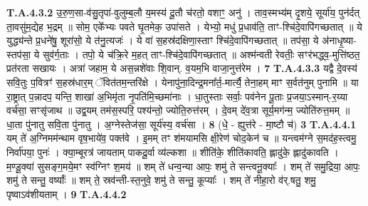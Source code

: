 \documentclass[17pt]{extarticle}
\begin{document}
                  \newline
                                                                  \textbf{ T.A.4.3.2} \newline
                  उ॒रु॒ण॒सा-व॑सु॒तृपा॑-वुलुम्ब॒लौ य॒मस्य॑ दू॒तौ च॑रतो॒ वशाꣳ॒॒ अनु॑ । ताव॒स्मभ्य॑म् दृ॒शये॒ सूर्या॑य॒ पुन॑र्दत् ता॒वसु॑म॒द्येह भ॒द्रम् ॥  सोम॒ एके᳚भ्यः पवते घृ॒तमेक॒ उपा॑सते ।  येभ्यो॒ मधु॑ प्र॒धाव॑ति॒ ताꣳ-श्चि॑दे॒वापि॑गच्छतात् ॥  ये युद्ध्य॑न्ते प्र॒धने॑षु॒ शूरा॑सो॒ ये त॑नु॒त्यजः॑ । ये वा॑ स॒हस्र॑दक्षिणा॒स्ताꣳ श्चि॑दे॒वापि॑गच्छतात् ॥  तप॑सा॒ ये अ॑नाधृ॒ष्या-स्तप॑सा॒ ये सुव॑र्ग॒ताः ।  तपो॒ ये च॑क्रि॒रे म॒हत् ताꣳ-श्चि॑दे॒वापि॑गच्छतात् ॥  अश्म॑न्वती रेवतीः॒ सꣳर॑भद्ध्व॒-मुत्ति॑ष्ठत॒ प्रत॑रता सखायः । अत्रा॑ जहाम॒ ये अस॒न्नशे॑वाः शि॒वान्. व॒यम॒भि वाजा॒नुत्त॑रेम । \textbf{ 7} \newline
                  \newline
                                                                  \textbf{ T.A.4.3.3} \newline
                  यद्वै दे॒वस्य॑ सवि॒तुः प॒वित्रꣳ॑ स॒हस्र॑धार॒म् ॅवित॑तम॒न्तरि॑क्षे । येनापु॑ना॒दिन्द्र॒मना᳚र्त॒-मार्त्यै॒ तेना॒हम् माꣳ स॒र्वत॑नुम् पुनामि ॥  या रा॒ष्ट्रात् प॒न्नादप॒ यन्ति॒ शाखा॑ अ॒भिमृ॑ता नृ॒पति॑मि॒च्छमा॑नाः । धा॒तुस्ताः सर्वाः॒ पव॑नेन पू॒ताः प्र॒जया॒ऽस्मान्-र॒य्या वर्च॑सा॒ सꣳसृ॑जाथ ॥  उद्व॒यम् तम॑स॒स्परि॒ पश्य॑न्तो॒ ज्योति॒रुत्त॑रम् ।  दे॒वम् दे॑व॒त्रा सूर्य॒मग॑न्म॒ ज्योति॑रुत्त॒मम् ॥  धा॒ता पु॑नातु सवि॒ता पु॑नातु । अ॒ग्नेस्तेज॑सा॒ सूर्य॑स्य॒ वर्च॑सा । \textbf{ 8} \newline
                  \newline
                                                        (धे॒ - ह्युत्त॑रे - मा॒ष्टौ च॑) \textbf{3} \newline \newline
                                \textbf{ T.A.4.4.1} \newline
                  यम् ते॑ अ॒ग्निमम॑न्थाम वृष॒भाये॑व॒ पक्त॑वे ।  इ॒मम् तꣳ श॑मयामसि क्षी॒रेण॑ चोद॒केन॑ च ॥  यन्त्वम॑ग्ने स॒मद॑ह॒स्त्वमु॒ निर्वा॑पया॒ पुनः॑ ।  क्या॒म्बूरत्र॑ जायताम् पाकदू॒र्वा व्य॑ल्कशा ॥  शीति॑के॒ शीति॑कावति॒ ह्लादु॑के॒ ह्लादु॑कावति ।  म॒ण्डू॒क्या॑ सुसङ्ग॒मये॒मꣳ स्व॑ग्निꣳ श॒मय॑ ॥ शम् ते॑ धन्व॒न्या आपः॒ शमु॑ ते सन्त्वनू॒क्याः᳚ । शम् ते॑ समु॒द्रिया॒ आपः॒ शमु॑ ते सन्तु॒ वर्ष्याः᳚ ॥  शम् ते॒ स्रव॑न्ती-स्त॒नुवे॒ शमु॑ ते सन्तु॒ कूप्याः᳚ ।  शम् ते॑ नीहा॒रो व॑र्.षतु॒ शमु॒ पृष्वाऽव॑शीयताम् । \textbf{ 9} \newline
                  \newline
                                                                  \textbf{ T.A.4.4.2} \newline
\end{document}
